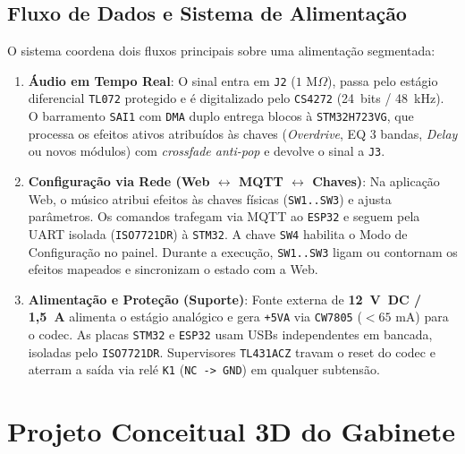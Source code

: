\documentclass[12pt,openright,oneside,a4paper,brazil]{abntex2}
\begin{document}
\section{Fluxo de Dados e Sistema de Alimentação}
O sistema coordena dois fluxos principais sobre uma alimentação segmentada:
\begin{enumerate}
  \item \textbf{Áudio em Tempo Real}: O sinal entra em \texttt{J2} ($1\text{ M}\Omega$), passa pelo estágio diferencial \texttt{TL072} protegido e é digitalizado pelo \texttt{CS4272} (24~bits / 48~kHz). O barramento \texttt{SAI1} com \texttt{DMA} duplo entrega blocos à \texttt{STM32H723VG}, que processa os efeitos ativos atribuídos às chaves (\textit{Overdrive}, EQ 3 bandas, \textit{Delay} ou novos módulos) com \textit{crossfade anti-pop} e devolve o sinal a \texttt{J3}.
  \item \textbf{Configuração via Rede (Web $\leftrightarrow$ MQTT $\leftrightarrow$ Chaves)}: Na aplicação Web, o músico atribui efeitos às chaves físicas (\texttt{SW1..SW3}) e ajusta parâmetros. Os comandos trafegam via MQTT ao \texttt{ESP32} e seguem pela UART isolada (\texttt{ISO7721DR}) à \texttt{STM32}. A chave \texttt{SW4} habilita o Modo de Configuração no painel. Durante a execução, \texttt{SW1..SW3} ligam ou contornam os efeitos mapeados e sincronizam o estado com a Web.
  \item \textbf{Alimentação e Proteção (Suporte)}: Fonte externa de \textbf{12~V~DC / 1,5~A} alimenta o estágio analógico e gera \texttt{+5VA} via \texttt{CW7805} ($< 65\text{ mA}$) para o codec. As placas \texttt{STM32} e \texttt{ESP32} usam USBs independentes em bancada, isoladas pelo \texttt{ISO7721DR}. Supervisores \texttt{TL431ACZ} travam o reset do codec e aterram a saída via relé \texttt{K1} (\texttt{NC -> GND}) em qualquer subtensão.
\end{enumerate}

\chapter{Projeto Conceitual 3D do Gabinete}
\end{document}
